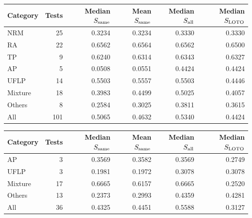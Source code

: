 \begin{tabular}{lrrrrr}
\toprule
Category & Tests & Median $S_{\rm same}$ & Mean $S_{\rm same}$ & Median $S_{\rm all}$ & Median $S_{\rm LOTO}$ \\
\midrule
NRM & 25 & 0.3234 & 0.3234 & 0.3330 & 0.3330 \\
RA & 22 & 0.6562 & 0.6564 & 0.6562 & 0.6500 \\
TP & 9 & 0.6240 & 0.6314 & 0.6343 & 0.6327 \\
AP & 5 & 0.0508 & 0.0551 & 0.4424 & 0.4424 \\
UFLP & 14 & 0.5503 & 0.5557 & 0.5503 & 0.4446 \\
Mixture & 18 & 0.3983 & 0.4499 & 0.5025 & 0.4057 \\
Others & 8 & 0.2584 & 0.3025 & 0.3811 & 0.3615 \\
All & 101 & 0.5065 & 0.4632 & 0.5340 & 0.4424 \\
\bottomrule
\end{tabular}

\begin{tabular}{lrrrrr}
\toprule
Category & Tests & Median $S_{\rm same}$ & Mean $S_{\rm same}$ & Median $S_{\rm all}$ & Median $S_{\rm LOTO}$ \\
\midrule
AP & 3 & 0.3569 & 0.3582 & 0.3569 & 0.2749 \\
UFLP & 3 & 0.1981 & 0.1972 & 0.3078 & 0.3078 \\
Mixture & 17 & 0.6665 & 0.6157 & 0.6665 & 0.2520 \\
Others & 13 & 0.2373 & 0.2993 & 0.4359 & 0.4281 \\
All & 36 & 0.4325 & 0.4451 & 0.5588 & 0.3127 \\
\bottomrule
\end{tabular}

